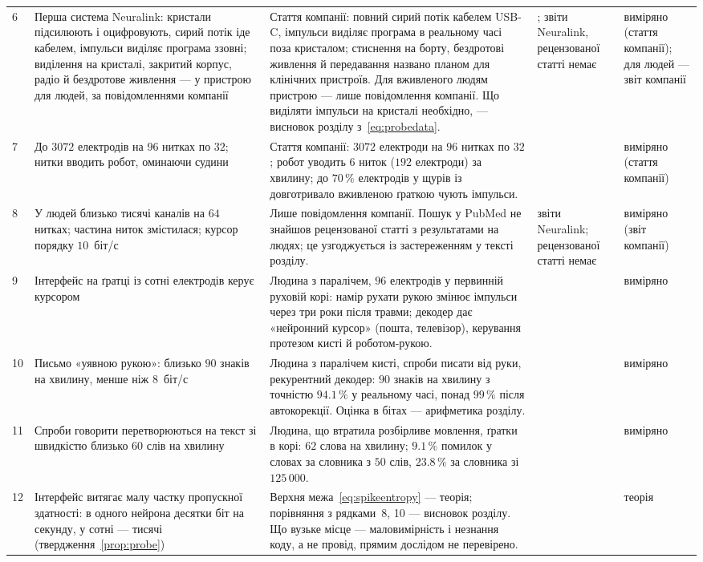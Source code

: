 {\begin{longtable}{>{\raggedright}p{0.5cm}>{\raggedright}p{4.0cm}>{\raggedright}p{5.6cm}>{\raggedright}p{2.3cm}>{\raggedright\arraybackslash}p{1.7cm}}
6 & Перша система Neuralink: кристали підсилюють і оцифровують, сирий потік іде кабелем, імпульси виділяє програма ззовні; виділення на кристалі, закритий корпус, радіо й бездротове живлення --- у пристрою для людей, за повідомленнями компанії & Стаття компанії: повний сирий потік кабелем USB-C, імпульси виділяє програма в реальному часі поза кристалом; стиснення на борту, бездротові живлення й передавання названо планом для клінічних пристроїв. Для вживленого людям пристрою --- лише повідомлення компанії. Що виділяти імпульси на кристалі необхідно, --- висновок розділу з~\eqref{eq:probedata}. & \cite{Musk2019}; звіти Neuralink, рецензованої статті немає & виміряно (стаття компанії); для людей --- звіт компанії \\
7 & До $3072$ електродів на $96$ нитках по $32$; нитки вводить робот, оминаючи судини & Стаття компанії: $3072$ електроди на $96$ нитках по $32$; робот уводить $6$ ниток ($192$ електроди) за хвилину; до $70\,\%$ електродів у щурів із довготривало вживленою ґраткою чують імпульси. & \cite{Musk2019} & виміряно (стаття компанії) \\
8 & У людей близько тисячі каналів на $64$ нитках; частина ниток змістилася; курсор порядку $10$~біт/с & Лише повідомлення компанії. Пошук у PubMed не знайшов рецензованої статті з результатами на людях; це узгоджується із застереженням у тексті розділу. & звіти Neuralink; рецензованої статті немає & виміряно (звіт компанії) \\
9 & Інтерфейс на ґратці із сотні електродів керує курсором & Людина з паралічем, $96$ електродів у первинній руховій корі: намір рухати рукою змінює імпульси через три роки після травми; декодер дає «нейронний курсор» (пошта, телевізор), керування протезом кисті й роботом-рукою. & \cite{Hochberg2006} & виміряно \\
10 & Письмо «уявною рукою»: близько $90$ знаків на хвилину, менше ніж $8$~біт/с & Людина з паралічем кисті, спроби писати від руки, рекурентний декодер: $90$ знаків на хвилину з точністю $94.1\,\%$ у реальному часі, понад $99\,\%$ після автокорекції. Оцінка в бітах --- арифметика розділу. & \cite{Willett2021} & виміряно \\
11 & Спроби говорити перетворюються на текст зі швидкістю близько $60$ слів на хвилину & Людина, що втратила розбірливе мовлення, ґратки в корі: $62$ слова на хвилину; $9.1\,\%$ помилок у словах за словника з $50$ слів, $23.8\,\%$ за словника зі $125\,000$. & \cite{Willett2023} & виміряно \\
12 & Інтерфейс витягає малу частку пропускної здатності: в одного нейрона десятки біт на секунду, у сотні --- тисячі (твердження~\ref{prop:probe}) & Верхня межа~\eqref{eq:spikeentropy} --- теорія; порівняння з рядками~8, 10 --- висновок розділу. Що вузьке місце --- маловимірність і незнання коду, а не провід, прямим дослідом не перевірено. & \cite{Rieke1997} & теорія \\

\end{longtable}}
